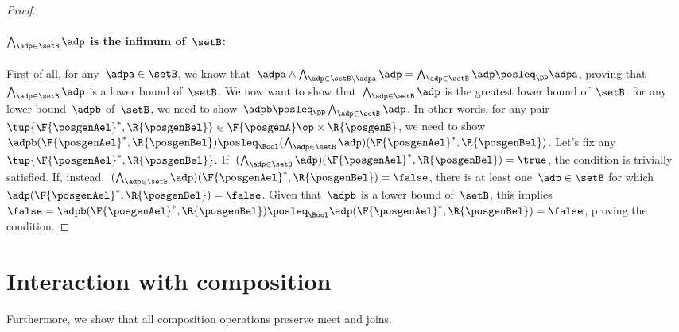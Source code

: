 \begin{proof}
    \paragraph*{$\bigwedge_{\adp \in \setB} \adp$ is the infimum of~$\setB$:}
    First of all, for any~$\adpa\in \setB$, we know that~$\adpa \wedge \bigwedge_{\adp \in \setB \backslash \adpa} \adp= \bigwedge_{\adp \in \setB} \adp \posleq_\DP \adpa$, proving that~$\bigwedge_{\adp \in \setB} \adp$ is a lower bound of~$\setB$.
    We now want to show that~$\bigwedge_{\adp \in \setB} \adp$ is the greatest lower bound of~$\setB$: for any lower bound~$\adpb$ of~$\setB$, we need to show~$\adpb\posleq_\DP\bigwedge_{\adp \in \setB} \adp $.
    In other words, for any pair~$\tup{\F{\posgenAel}^*,\R{\posgenBel}}\in \F{\posgenA}\op\times \R{\posgenB}$, we need to show~$\adpb(\F{\posgenAel}^*,\R{\posgenBel}) \posleq_\Bool (\bigwedge_{\adp \in \setB} \adp)(\F{\posgenAel}^*,\R{\posgenBel})$.
    Let's fix any~$\tup{\F{\posgenAel}^*,\R{\posgenBel}}$. If~$(\bigwedge_{\adp \in \setB} \adp)(\F{\posgenAel}^*,\R{\posgenBel})=\true$, the condition is trivially satisfied.
    If, instead,~$(\bigwedge_{\adp \in \setB} \adp)(\F{\posgenAel}^*,\R{\posgenBel})=\false$, there is at least one~$\adp\in \setB$ for which~$\adp(\F{\posgenAel}^*,\R{\posgenBel})=\false$.
    Given that~$\adpb$ is a lower bound of~$\setB$, this implies~$\false=\adpb(\F{\posgenAel}^*,\R{\posgenBel})\posleq_\Bool \adp(\F{\posgenAel}^*,\R{\posgenBel})=\false$, proving the condition.
\end{proof}

\section{Interaction with composition}

Furthermore, we show that all composition operations preserve meet and joins.

